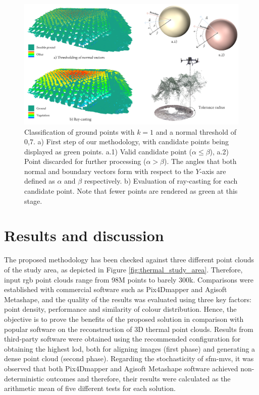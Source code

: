 \begin{figure}
    \centering
    \includegraphics{figs/thermal_projection/thermal_classification_result.png}
	\caption{Classification of ground points with $k = 1$ and a normal threshold of 0,7. a) First step of our methodology, with candidate points being displayed as green points. a.1) Valid candidate point ($\alpha \leq \beta$), a.2) Point discarded for further processing ($\alpha > \beta$). The angles that both normal and boundary vectors form with respect to the $Y$-axis are defined as $\alpha$ and $\beta$ respectively. b) Evaluation of ray-casting for each candidate point. Note that fewer points are rendered as green at this stage. }
	\label{fig:thermal_ground_classification}
\end{figure}

\section{Results and discussion}

The proposed methodology has been checked against three different point clouds of the study area, as depicted in Figure \ref{fig:thermal_study_area}. Therefore, input \acrshort{rgb} point clouds range from 98M points to barely 300k. Comparisons were established with commercial software such as Pix4Dmapper and Agisoft Metashape, and the quality of the results was evaluated using three key factors: point density, performance and similarity of colour distribution. Hence, the objective is to prove the benefits of the proposed solution in comparison with popular software on the reconstruction of 3D thermal point clouds. Results from third-party software were obtained using the recommended configuration for obtaining the highest \acrshort{lod}, both for aligning images (first phase) and generating a dense point cloud (second phase). Regarding the stochasticity of \acrshort{sfm}-\acrshort{mvs}, it was observed that both Pix4Dmapper and Agisoft Metashape software achieved non-deterministic outcomes and therefore, their results were calculated as the arithmetic mean of five different tests for each solution.

